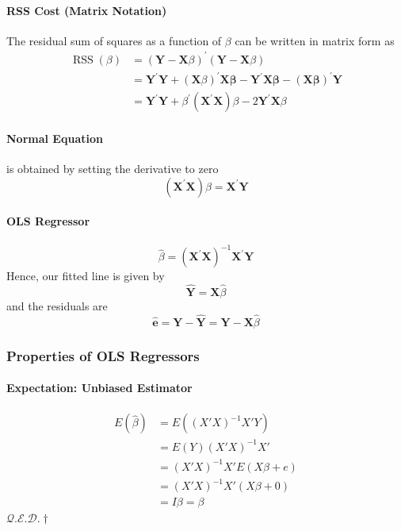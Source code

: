 \documentclass[11pt]{article}
\newcommand{\qed}{\hfill $\mathcal{Q}.\mathcal{E}.\mathcal{D}.\dagger$}
\begin{document}
\paragraph{RSS Cost (Matrix Notation)}
The residual sum of squares as a function of $\beta$ can be written in matrix form as
\begin{align*}
    \operatorname{RSS}(\beta)
    &=(\mathbf{Y}-\mathbf{X} \beta)^{\prime}(\mathbf{Y}-\mathbf{X} \beta) \\
    &= \mathbf{Y}^{\prime} \mathbf{Y}+(\mathbf{X} \beta)^{\prime} \mathbf{X} \boldsymbol{\beta}-\mathbf{Y}^{\prime} \mathbf{X} \boldsymbol{\beta}-(\mathbf{X} \boldsymbol{\beta})^{\prime} \mathbf{Y} \\
    &= \mathbf{Y}^{\prime} \mathbf{Y}+\beta^{\prime}\left(\mathbf{X}^{\prime} \mathbf{X}\right) \beta-2 \mathbf{Y}^{\prime} \mathbf{X} \beta
\end{align*}
\paragraph{Normal Equation} is obtained by setting the derivative to zero
\begin{equation*}
    \left(\mathbf{X}^{\prime} \mathbf{X}\right) \beta=\mathbf{X}^{\prime} \mathbf{Y}
\end{equation*}
\paragraph{OLS Regressor}
\begin{equation*}
    \hat{\beta}=\left(\mathbf{X}^{\prime} \mathbf{X}\right)^{-1} \mathbf{X}^{\prime} \mathbf{Y}
\end{equation*}
Hence, our fitted line is given by
\begin{equation*}
    \hat{\mathbf{Y}}=\mathbf{X} \hat{\beta}
\end{equation*}
and the residuals are
\begin{equation*}
    \hat{\mathbf{e}}=\mathbf{Y}-\hat{\mathbf{Y}}=\mathbf{Y}-\mathbf{X} \hat{\beta}
\end{equation*}


\subsubsection{Properties of OLS Regressors}
\paragraph{Expectation: Unbiased Estimator}
\begin{align*}
    E(\hat{\beta}) &= E((X'X)^{-1}X'Y) \\
    &= E(Y)(X'X)^{-1}X' \\
    &= (X'X)^{-1}X' E(X\beta + e) \\
    &= (X'X)^{-1}X' (X\beta + 0) \\
    &= I\beta = \beta
\end{align*}
\qed
\end{document}
